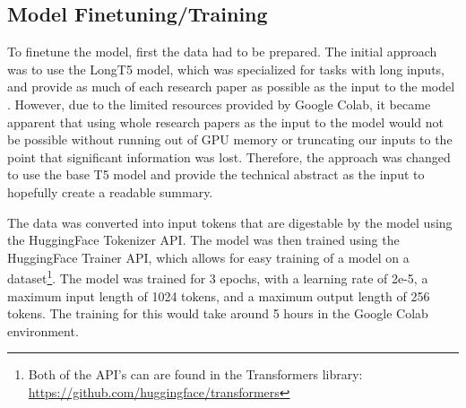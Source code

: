 \documentclass[11pt,a4paper]{article}
\begin{document}
\subsection{Model Finetuning/Training}
\indent \indent To finetune the model, first the data had to be prepared. The initial approach was to use the LongT5 model, which was specialized for tasks with long inputs, and provide as much of each research paper as possible as the input to the model \cite{guo2022longt5}. However, due to the limited resources provided by Google Colab, it became apparent that using whole research papers as the input to the model would not be possible without running out of GPU memory or truncating our inputs to the point that significant information was lost. Therefore, the approach was changed to use the base T5 model and provide the technical abstract as the input to hopefully create a readable summary.


The data was converted into input tokens that are digestable by the model using the HuggingFace Tokenizer API. The model was then trained using the HuggingFace Trainer API, which allows for easy training of a model on a dataset\footnote{Both of the API's can are found in the Transformers library: \url{https://github.com/huggingface/transformers}}. The model was trained for 3 epochs, with a learning rate of 2e-5, a maximum input length of 1024 tokens, and a maximum output length of 256 tokens. The training for this would take around 5 hours in the Google Colab environment.
\end{document}
